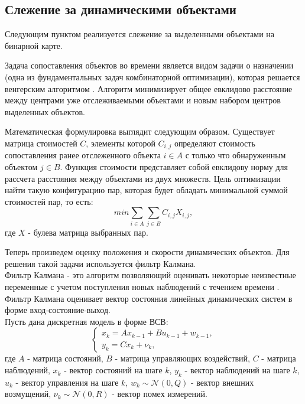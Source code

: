 \subsection{Слежение за динамическими объектами}
Следующим пунктом реализуется слежение за выделенными объектами на бинарной карте. 

Задача сопоставления объектов во времени является видом задачи о назначении (одна из фундаментальных задач комбинаторной оптимизации), которая решается венгерским алгоритмом \cite{hung-alg}. Алгоритм минимизирует общее евклидово расстояние между центрами уже отслеживаемыми объектами и новым набором центров выделенных объектов. 

Математическая формулировка выглядит следующим образом. Существует матрица стоимостей $C$, элементы которой $C_{i,j}$ определяют стоимость сопоставления ранее отслеженного объекта $i \in A$ с только что обнаруженным объектом $j \in B$. Функция стоимости представляет собой евклидову норму для рассчета расстояния между объектами из двух множеств. Цель оптимизации найти такую конфигурацию пар, которая будет обладать минимальной суммой стоимостей пар, то есть:
\begin{equation}
    min \sum_{i \in A} \sum_{j \in B} C_{i,j} X_{i,j},
\end{equation}
где $X$ - булева матрица выбранных пар.

Теперь произведем оценку положения и скорости динамических объектов. Для решения такой задачи используется фильтр Калмана. \\
Фильтр Калмана - это алгоритм позволяющий оценивать некоторые неизвестные переменные с учетом поступления новых наблюдений с течением времени \cite{kalman1}. Фильтр Калмана оценивает вектор состояния линейных динамических систем в форме вход-состояние-выход. \\
Пусть дана дискретная модель в форме ВСВ:
\begin{equation}
    \begin{cases}
        x_k = A x_{k-1} + B u_{k-1} + w_{k-1}, \\
        y_k = C x_k + \nu_k,
    \end{cases}
\end{equation}
где $A$ - матрица состояний, $B$ - матрица управляющих воздействий, $C$ - матрица наблюдений, $x_k$ - вектор состояний на шаге $k$, $y_k$ - вектор наблюдений на шаге $k$, $u_k$ - вектор управления на шаге $k$, $w_k \sim \mathcal{N}(0, Q)$ - вектор внешних возмущений, $\nu_k \sim \mathcal{N}(0, R)$ - вектор помех измерений.

